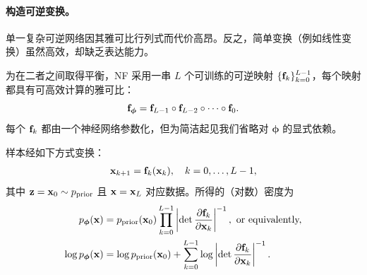 \paragraph{构造可逆变换。}






单一复杂可逆网络因其雅可比行列式而代价高昂。反之，简单变换（例如线性变换）虽然高效，却缺乏表达能力。


为在二者之间取得平衡，NF 采用一串 $L$ 个可训练的可逆映射 $\{{\mathbf{f}}_k\}_{k=0}^{L-1}$，每个映射都具有可高效计算的雅可比：
\[
{\mathbf{f}}_{\bm{\phi}} = {\mathbf{f}}_{L-1} \circ {\mathbf{f}}_{L-2} \circ \cdots \circ {\mathbf{f}}_0.
\]
每个 ${\mathbf{f}}_k$ 都由一个神经网络参数化，但为简洁起见我们省略对 ${\bm{\phi}}$ 的显式依赖。


样本经如下方式变换：
\begin{align}\label{eq:nf-seq}
{\mathbf{x}}_{k+1} = {\mathbf{f}}_k({\mathbf{x}}_k), \quad k = 0, \ldots, L-1,
\end{align}
其中 ${\mathbf{z}}={\mathbf{x}}_0 \sim p_{\text{prior}}$ 且 ${\mathbf{x}} = {\mathbf{x}}_L$ 对应数据。所得的（对数）密度为
\begin{align}\label{eq:multi-nf-density}
\begin{aligned}
    p_{\bm{\phi}}({\mathbf{x}}) &= p_{\text{prior}}({\mathbf{x}}_0) \prod_{k=0}^{L-1} \left| \det \frac{\partial {\mathbf{f}}_k}{\partial {\mathbf{x}}_k} \right|^{-1}, \text{ or equivalently,}\\
\log p_{\bm{\phi}}({\mathbf{x}}) &= \log p_{\text{prior}}({\mathbf{x}}_0) + \sum_{k=0}^{L-1} \log \left| \det \frac{\partial {\mathbf{f}}_k}{\partial {\mathbf{x}}_k} \right|^{-1}.
\end{aligned}
\end{align}


